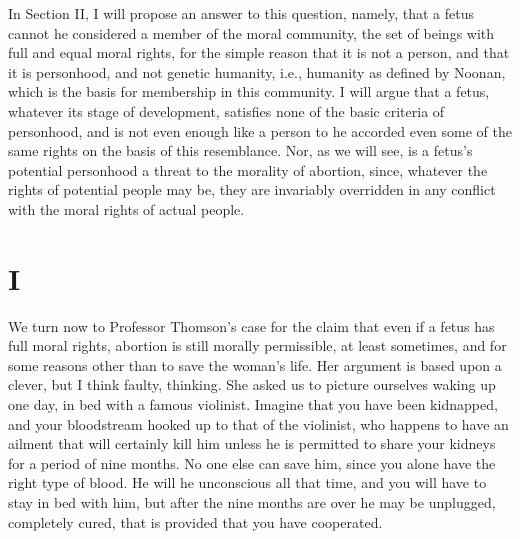 In Section II, I will propose an answer to this question,
namely, that a fetus cannot he considered a member of the
moral community, the set of beings with full and equal
moral rights, for the simple reason that it is not a person,
and that it is personhood, and not genetic humanity, i.e.,
humanity as defined by Noonan, which is the basis for
membership in this community. I will argue that a fetus,
whatever its stage of development, satisfies none of the
basic criteria of personhood, and is not even enough like a
person to he accorded even some of the same rights on the
basis of this resemblance. Nor, as we will see, is a fetus’s
potential personhood a threat to the morality of abortion,
since, whatever the rights of potential people may be, they
are invariably overridden in any conflict with the moral
rights of actual people.

\section{I}

We turn now to Professor Thomson’s case for the claim
that even if a fetus has full moral rights, abortion is still
morally permissible, at least sometimes, and for some
reasons other than to save the woman’s life. Her argument
is based upon a clever, but I think faulty, thinking. She
asked us to picture ourselves waking up one day, in bed
with a famous violinist. Imagine that you have been
kidnapped, and your bloodstream hooked up to that of the
violinist, who happens to have an ailment that will
certainly kill him unless he is permitted to share your
kidneys for a period of nine months. No one else can save
him, since you alone have the right type of blood. He will
he unconscious all that time, and you will have to stay in
bed with him, but after the nine months are over he may
be unplugged, completely cured, that is provided that you
have cooperated.


